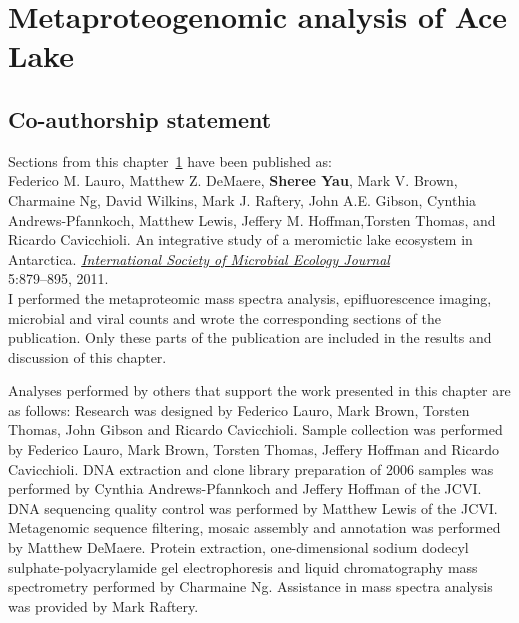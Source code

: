 \chapter{Metaproteogenomic analysis of Ace Lake}
\label{ch:ace}

\section*{Co-authorship statement}

Sections from this chapter~\ref{ch:ace} have been published as:\\

Federico M. Lauro, Matthew Z. DeMaere, \textbf{Sheree Yau}, Mark V. Brown, Charmaine Ng,
David Wilkins, Mark J. Raftery, John A.E. Gibson, Cynthia Andrews-Pfannkoch, Matthew Lewis,
Jeffery M. Hoffman,Torsten Thomas, and Ricardo Cavicchioli. 
An integrative study of a meromictic lake ecosystem in Antarctica.
\emph{\underline{International Society of Microbial Ecology Journal}}\\
5:879--895, 2011.\\

I performed the metaproteomic mass spectra analysis, epifluorescence imaging,
microbial and viral counts and wrote the corresponding sections of the publication.
Only these parts of the publication are included in the results and discussion of this chapter.

Analyses performed by others that support the work presented in this chapter are as follows:
Research was designed by Federico Lauro, Mark Brown, Torsten Thomas, John Gibson and Ricardo Cavicchioli.
Sample collection was performed by Federico Lauro, Mark Brown, Torsten Thomas, Jeffery Hoffman and Ricardo Cavicchioli.
DNA extraction and clone library preparation of 2006 samples was performed by Cynthia Andrews-Pfannkoch and Jeffery Hoffman of the \ac{JCVI}.
DNA sequencing quality control was performed by Matthew Lewis of the \ac{JCVI}.
Metagenomic sequence filtering, mosaic assembly and annotation was performed by Matthew DeMaere.
Protein extraction, one-dimensional sodium dodecyl sulphate-polyacrylamide gel electrophoresis and liquid chromatography mass spectrometry performed by Charmaine Ng.
Assistance in mass spectra analysis was provided by Mark Raftery.
\newpage


